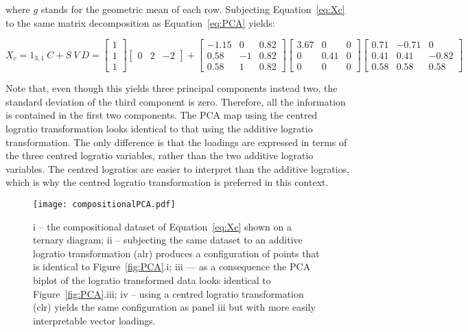 \documentclass[11pt]{article}
\begin{document}
\noindent where $g$ stands for the geometric mean of each
row. Subjecting Equation~\ref{eq:Xc} to the same matrix decomposition
as Equation~\ref{eq:PCA} yields:
  
\begin{equation}
    X_c = 1_{3,1}~C + S~V~D = \left[
      \begin{array}{c}
        1 \\
        1 \\
       1
      \end{array}
      \right]
   \left[
    \begin{array}{ccc}
        0 & 2 & -2
      \end{array}
      \right]
    + 
    \left[
      \begin{array}{ccc}
        -1.15 &  0 & 0.82 \\
        0.58  & -1 & 0.82 \\
        0.58  &  1 & 0.82
      \end{array}
      \right]
    \left[
      \begin{array}{ccc}
        3.67 & 0 & 0 \\
        0 & 0.41 & 0 \\
        0 & 0 & 0
      \end{array}
      \right]
    \left[
      \begin{array}{ccc}
        0.71 & -0.71 &  0 \\
        0.41 &  0.41 & -0.82 \\
        0.58 &  0.58 &  0.58
      \end{array}
      \right]
    \label{eq:PCAcomp}
  \end{equation}

Note that, even though this yields three principal components instead
two, the standard deviation of the third component is zero.
Therefore, all the information is contained in the first two
components.  The PCA map using the centred logratio transformation
looks identical to that using the additive logratio
transformation. The only difference is that the loadings are expressed
in terms of the three centred logratio variables, rather than the two
additive logratio variables. The centred logratios are easier to
interpret than the additive logratios, which is why the centred
logratio transformation is preferred in this context.

\begin{figure}[!ht]
  \centering
  \texttt{[image: compositionalPCA.pdf]}
  \caption{i -- the compositional dataset of Equation~\ref{eq:Xc}
    shown on a ternary diagram; ii -- subjecting the same dataset to
    an additive logratio transformation (alr) produces a configuration
    of points that is identical to Figure~\ref{fig:PCA}.i; iii --- as
    a consequence the PCA biplot of the logratio transformed data
    looks identical to Figure~\ref{fig:PCA}.iii; iv -- using a centred
    logratio transformation (clr) yields the same configuration as
    panel iii but with more easily interpretable vector loadings.}
  \label{fig:compositionalPCA}
\end{figure}
\end{document}
